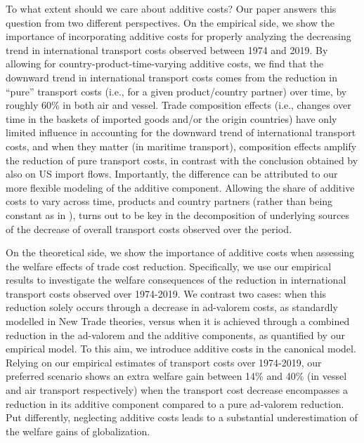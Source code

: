 \documentclass[a4paper,11pt]{article}
\begin{document}
To what extent should we care about additive costs? Our paper answers this question from two different perspectives.
On the empirical side, we show the importance of incorporating additive costs for properly analyzing the decreasing trend in international transport costs observed between 1974 and 2019. By allowing for country-product-time-varying additive costs, we find that the downward trend in international transport costs comes from the reduction in ``pure'' transport costs (i.e., for a given product/country partner) over time, by roughly 60\% in both air and vessel. Trade composition effects (i.e., changes over time in the baskets of imported goods and/or the origin countries) have only limited influence in accounting for the downward trend of international transport costs, and when they matter (in maritime transport), composition effects amplify the reduction of pure transport costs, in contrast with the conclusion obtained by \cite{hummels2007} also on US import flows. Importantly, the difference can be attributed to our more flexible modeling of the additive component. Allowing the share of additive costs to vary across time, products and country partners (rather than being constant as in \citealp{hummels2007}), turns out to be key in the decomposition of underlying sources of the decrease of overall transport costs observed over the period.\smallskip

On the theoretical side, we show the importance of additive costs when assessing the welfare effects of trade cost reduction. Specifically, we use our empirical results to investigate the welfare consequences of the reduction in international transport costs observed over 1974-2019. We contrast two cases: when this reduction solely occurs through a decrease in ad-valorem costs, as standardly modelled in New Trade theories, versus when it is achieved through a combined reduction in the ad-valorem and the additive components, as quantified by our empirical model. To this aim, we introduce additive costs in the canonical \cite{melitz} model. Relying on our empirical estimates of transport costs
over 1974-2019, our preferred scenario shows an extra welfare gain between 14\% and 40\% (in vessel and air transport respectively) when the transport cost decrease encompasses a reduction in its additive component compared to a pure ad-valorem reduction. Put differently, neglecting additive costs leads to a substantial underestimation of the welfare gains of globalization.
\end{document}
